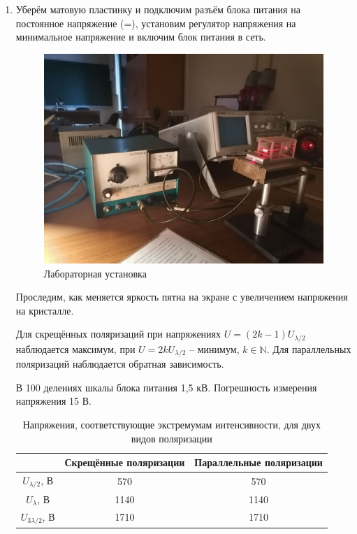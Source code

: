 \documentclass[a4paper, 12pt]{article}
\begin{document}
\begin{enumerate}
По углу наклона прямой определим двулучепреломление $(n_o-n_e)$ ниобата лития, пользуясь формулой (\ref{Radius_equation}); $\lambda =~$0,63 мкм, $L =~$75 см, $l =~$3 см (длина кристалла), $n_o =~$2,29:

\[n_o - n_e \approx \text{0,089}\pm\text{0,012}}\]

\item Уберём матовую пластинку и подключим разъём блока питания на постоянное напряжение (=), установим регулятор напряжения на минимальное напряжение и включим блок питания в сеть.

\begin{figure}[h!]
	\includegraphics[width=1\textwidth]{Установка.jpg}
	\caption{Лабораторная установка}
	\label{Facility}
\end{figure}

Проследим, как меняется яркость пятна на экране с увеличением напряжения на кристалле.

Для скрещённых поляризаций при напряжениях $U = (2k-1)U_{\lambda/2}$ наблюдается максимум, при $U = 2kU_{\lambda/2}$ -- минимум, $k \in \mathbb{N}$. Для параллельных поляризаций наблюдается обратная зависимость.

В 100 делениях шкалы блока питания 1,5 кВ. Погрешность измерения напряжения 15 В.

\clearpage
\begin{table}[h!]
	\centering
	\begin{tabular}{|c|c|c|}
		\hline
                & Скрещённые поляризации & Параллельные поляризации \\ \hline
$U_{\lambda/2}$, В  & 570                    & 570                      \\ \hline
$U_{\lambda}$, В    & 1140                   & 1140                     \\ \hline
$U_{3\lambda/2}$, В & 1710                   & 1710                     \\ \hline
	\end{tabular}
	\caption{Напряжения, соответствующие экстремумам интенсивности, для двух видов поляризации}
\end{table}


\end{enumerate}
\end{document}
